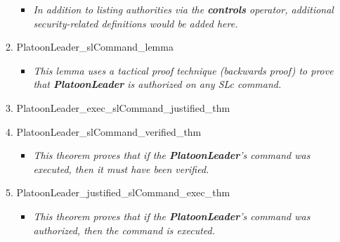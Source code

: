 \begin{enumerate}
\begin{enumerate}
\begin{itemize}
    \item \textit{In addition to listing authorities via the \textbf{controls} operator, additional
      security-related definitions would be added here.} \ \\
    \end{itemize}
    \item PlatoonLeader_slCommand_lemma
      \begin{itemize}
    \item \textit{This lemma uses a tactical proof technique (backwards proof) to prove that
      \textbf{PlatoonLeader} is authorized on any SLc command. }\ \\
    \end{itemize}
    \item PlatoonLeader_exec_slCommand_justified_thm
      \item PlatoonLeader_slCommand_verified_thm
        \begin{itemize}
    \item \textit{This theorem proves that if the \textbf{PlatoonLeader}’s command was executed,
      then it must have been verified.   }\ \\
    \end{itemize}
    \item PlatoonLeader_justified_slCommand_exec_thm
      \begin{itemize}
    \item \textit{This theorem proves that if the  \textbf{PlatoonLeader}’s command was authorized,
      then the command is executed.   } \ \\
    \end{itemize}
    \end{enumerate}
  \end{enumerate}

